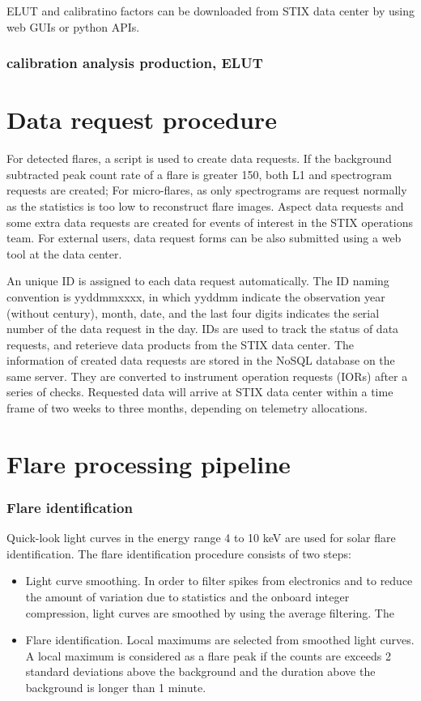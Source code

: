 \documentclass{aa}
\begin{document}
ELUT and calibratino factors can be downloaded from STIX data center by using web GUIs or python APIs.
\subsubsection{calibration analysis production, ELUT}

\section{Data request procedure}

For detected flares,  a script is used to create data requests.
If the background subtracted peak count rate of a flare is greater 150,
both L1 and spectrogram requests are created;  For micro-flares, as only
spectrograms are request normally as the statistics is too
low to reconstruct flare images.  Aspect data requests
and some extra data requests are created for events of interest in the
STIX operations team.
For external users, data request forms can be also submitted using a web tool
at the data center.

An unique ID is assigned to each data request automatically.
The ID naming convention is yyddmmxxxx, in which yyddmm indicate the observation year (without century), month, date,
and the last four digits indicates the serial number of the data request in the day.
IDs are used to track the status of data requests, and reterieve data products from the
STIX data center.
The information of created data requests are stored in the NoSQL database on the same server.
They are converted to instrument operation requests (IORs) after a series of checks.
Requested data will arrive at STIX data center within a time frame of two weeks to three months, depending on
telemetry allocations.


\section{Flare processing pipeline}

\subsubsection{Flare identification}
Quick-look light curves in the energy range 4 to 10 keV are used for solar flare identification.  The flare identification procedure consists of  two steps:
\begin{itemize}
\item Light curve smoothing. In order to filter spikes from electronics and to reduce the amount of variation due to statistics and the onboard integer compression, light curves are smoothed by using the average filtering. The
\item Flare identification. Local maximums are selected from smoothed light curves.  A local maximum is considered as a flare peak if the counts are exceeds 2 standard deviations above the background and the duration above the background is longer than 1 minute.
\end{itemize}
\end{document}
